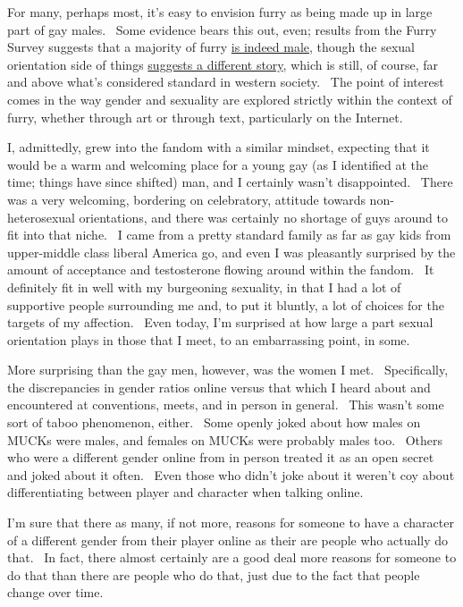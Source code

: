 For many, perhaps most, it's easy to envision furry as being made up in
large part of gay males. ~Some evidence bears this out, even; results
from the Furry Survey suggests that a majority of furry
\href{http://vis.adjectivespeces.com/furrysurvey/sexGender.shtml}{is
indeed male}, though the sexual orientation side of things
\href{http://vis.adjectivespeces.com/furrysurvey/orientation.shtml}{suggests
a different story}, which is still, of course, far and above what's
considered standard in western society. ~The point of interest comes in
the way gender and sexuality are explored strictly within the context of
furry, whether through art or through text, particularly on the
Internet.

I, admittedly, grew into the fandom with a similar mindset, expecting
that it would be a warm and welcoming place for a young gay (as I
identified at the time; things have since shifted) man, and I certainly
wasn't disappointed. ~There was a very welcoming, bordering on
celebratory, attitude towards non-heterosexual orientations, and there
was certainly no shortage of guys around to fit into that niche. ~I came
from a pretty standard family as far as gay kids from upper-middle class
liberal America go, and even I was pleasantly surprised by the amount of
acceptance and testosterone flowing around within the fandom. ~It
definitely fit in well with my burgeoning sexuality, in that I had a lot
of supportive people surrounding me and, to put it bluntly, a lot of
choices for the targets of my affection. ~Even today, I'm surprised at
how large a part sexual orientation plays in those that I meet, to an
embarrassing point, in some.

More surprising than the gay men, however, was the women I met.
~Specifically, the discrepancies in gender ratios online versus that
which I heard about and encountered at conventions, meets, and in person
in general. ~This wasn't some sort of taboo phenomenon, either. ~Some
openly joked about how males on MUCKs were males, and females on MUCKs
were probably males too. ~Others who were a different gender online from
in person treated it as an open secret and joked about it often. ~Even
those who didn't joke about it weren't coy about differentiating between
player and character when talking online.

I'm sure that there as many, if not more, reasons for someone to have a
character of a different gender from their player online as their are
people who actually do that. ~In fact, there almost certainly are a good
deal more reasons for someone to do that than there are people who do
that, just due to the fact that people change over time.

